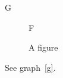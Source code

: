 \documentclass{article}
\begin{document}
\listofgraphs

\begin{graph}
  \centering G
  \caption{A graph}\label{g}
\end{graph}

\begin{figure}
  \centering F
  \caption{A figure}
\end{figure}

See graph~\ref{g}.
\end{document}
